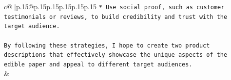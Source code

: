 \documentclass{article}
\begin{document}
{\begin{supertabular}{c@{$\;$}|p{.15\linewidth}@{}p{.15\linewidth}p{.15\linewidth}p{.15\linewidth}p{.15\linewidth}p{.15\linewidth}}
{{{\texttt{* Use social proof, such as customer testimonials or reviews, to build credibility and trust with the target audience.} \\
\\ 
\texttt{By following these strategies, I hope to create two product descriptions that effectively showcase the unique aspects of the edible paper and appeal to different target audiences.} \\
            }
        }
    }
    & \\ \\

\end{supertabular}
}
\end{document}
